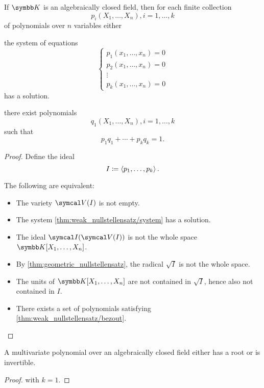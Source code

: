 \begin{corollary}\label{thm:weak_nullstellensatz}\cite{Tao:nullstellensatz}
  If \( \K \) is an algebraically closed field, then for each finite collection
  \begin{equation*}
    p_i(X_1, \ldots, X_n), i = 1, \ldots, k
  \end{equation*}
  of polynomials over \( n \) variables either
  \begin{itemize}
     the system of equations
    \begin{equation}\label{thm:weak_nullstellensatz/system}
      \begin{cases}
        p_1(x_1, \ldots, x_n) = 0 \\
        p_2(x_1, \ldots, x_n) = 0 \\
        \vdots \\
        p_k(x_1, \ldots, x_n) = 0
      \end{cases}
    \end{equation}
    has a solution.

     there exist polynomials
    \begin{equation*}
      q_1(X_1, \ldots, X_n), i = 1, \ldots, k
    \end{equation*}
    such that
    \begin{equation*}
      p_1 q_1 + \cdots + p_k q_k = 1.
    \end{equation*}
  \end{itemize}
\end{corollary}
\begin{proof}
  Define the ideal
  \begin{equation*}
    I \coloneqq \left\langle p_1, \ldots, p_k \right\rangle.
  \end{equation*}

  The following are equivalent:
  \begin{itemize}
    \item The variety \( \Cal{V}(I) \) is not empty.
    \item The system \cref{thm:weak_nullstellensatz/system} has a solution.
    \item The ideal \( \Cal{I}(\Cal{V}(I)) \) is not the whole space \( \K[X_1, \ldots, X_n] \).
    \item By \cref{thm:geometric_nullstellensatz}, the radical \( \sqrt I \) is not the whole space.
    \item The units of \( \K[X_1, \ldots, X_n] \) are not contained in \( \sqrt I \), hence also not contained in \( I \).
    \item There exists a set of polynomials satisfying \cref{thm:weak_nullstellensatz/bezout}.
  \end{itemize}
\end{proof}

\begin{corollary}\label{thm:polynomial_over_closed_field_is_either_invertible_or_has_root}
  A multivariate polynomial over an algebraically closed field either has a root or is invertible.
\end{corollary}
\begin{proof}
   with \( k = 1 \).
\end{proof}

